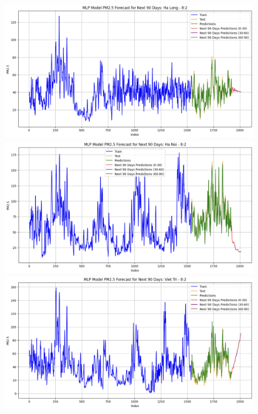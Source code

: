\begin{figure}[H]
    \begin{minipage}{0.15\textwidth}
        \centering
        \includegraphics[width=1\textwidth, height=0.6\textwidth]{img/final/MLP/90D/MLP_8_2_HL.png}
        \end{minipage}
        \hfill
        \begin{minipage}{0.15\textwidth}
        \centering
        \includegraphics[width=1\textwidth, height=0.6\textwidth]{img/final/MLP/90D/MLP_8_2_HN.png}
        \end{minipage}
        \hfill
        \begin{minipage}{0.15\textwidth}
        \centering
        \includegraphics[width=1\textwidth, height=0.6\textwidth]{img/final/MLP/90D/MLP_8_2_VT.png}
        \end{minipage}
        \hfill


\end{figure}
